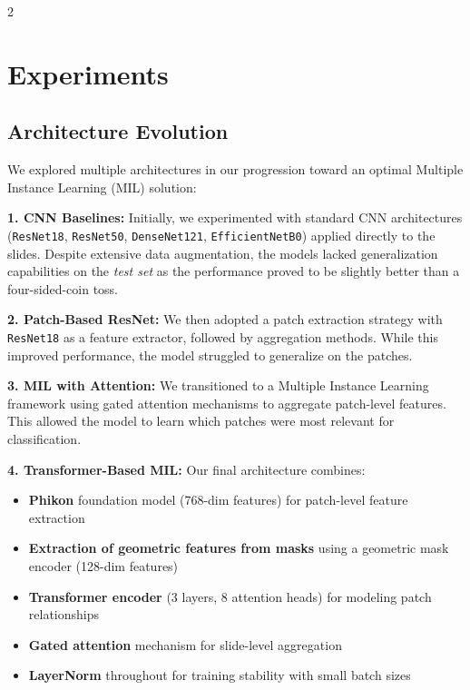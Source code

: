 \documentclass[11pt]{article}
\begin{document}
\begin{multicols}{2}
        \vspace{-1cm}
        \section{Experiments}
        \vspace{-0.2cm}

        \subsection{Architecture Evolution}
        We explored multiple architectures in our progression toward an optimal Multiple Instance Learning (MIL) solution:
        
        \textbf{1. CNN Baselines:} Initially, we experimented with standard CNN architectures (\texttt{ResNet18}, \texttt{ResNet50}, \texttt{DenseNet121}, \texttt{EfficientNetB0}) applied directly to the slides. Despite extensive data augmentation, the models lacked generalization capabilities on the \textit{test set} as the performance proved to be slightly better than a four-sided-coin toss.
        
        \textbf{2. Patch-Based ResNet:} We then adopted a patch extraction strategy with \texttt{ResNet18} as a feature extractor, followed by aggregation methods. While this improved performance, the model struggled to generalize on the patches.
        
        \textbf{3. MIL with Attention:} We transitioned to a Multiple Instance Learning framework using gated attention mechanisms to aggregate patch-level features. This allowed the model to learn which patches were most relevant for classification.
        
        \textbf{4. Transformer-Based MIL:} Our final architecture combines:
        \begin{itemize}[noitemsep,topsep=0pt]
            \setlength{\itemsep}{1pt}
            \item \textbf{Phikon} foundation model (768-dim features) for patch-level feature extraction
            \item \textbf{Extraction of geometric features from masks} using a geometric mask encoder (128-dim features)
            \item \textbf{Transformer encoder} (3 layers, 8 attention heads) for modeling patch relationships
            \item \textbf{Gated attention} mechanism for slide-level aggregation
            \item \textbf{LayerNorm} throughout for training stability with small batch sizes
        \end{itemize}
    

\end{multicols}
\end{document}
